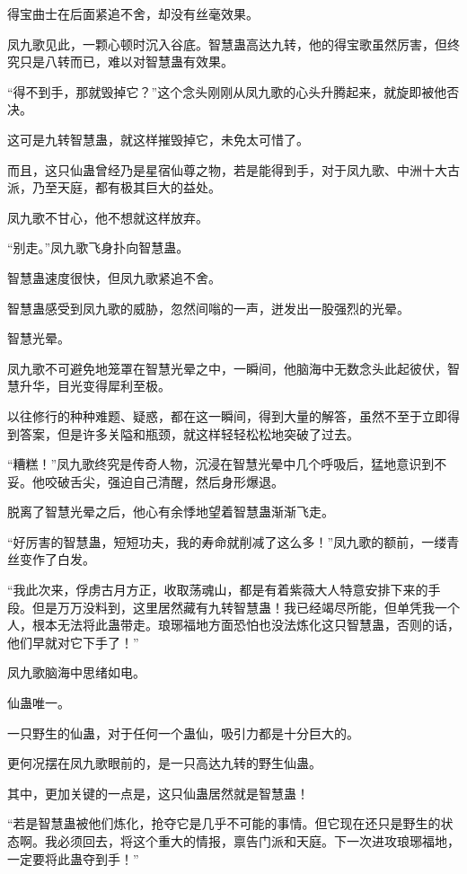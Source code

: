 \begin{this_body}
得宝曲士在后面紧追不舍，却没有丝毫效果。

凤九歌见此，一颗心顿时沉入谷底。智慧蛊高达九转，他的得宝歌虽然厉害，但终究只是八转而已，难以对智慧蛊有效果。

“得不到手，那就毁掉它？”这个念头刚刚从凤九歌的心头升腾起来，就旋即被他否决。

这可是九转智慧蛊，就这样摧毁掉它，未免太可惜了。

而且，这只仙蛊曾经乃是星宿仙尊之物，若是能得到手，对于凤九歌、中洲十大古派，乃至天庭，都有极其巨大的益处。

凤九歌不甘心，他不想就这样放弃。

“别走。”凤九歌飞身扑向智慧蛊。

智慧蛊速度很快，但凤九歌紧追不舍。

智慧蛊感受到凤九歌的威胁，忽然间嗡的一声，迸发出一股强烈的光晕。

智慧光晕。

凤九歌不可避免地笼罩在智慧光晕之中，一瞬间，他脑海中无数念头此起彼伏，智慧升华，目光变得犀利至极。

以往修行的种种难题、疑惑，都在这一瞬间，得到大量的解答，虽然不至于立即得到答案，但是许多关隘和瓶颈，就这样轻轻松松地突破了过去。

“糟糕！”凤九歌终究是传奇人物，沉浸在智慧光晕中几个呼吸后，猛地意识到不妥。他咬破舌尖，强迫自己清醒，然后身形爆退。

脱离了智慧光晕之后，他心有余悸地望着智慧蛊渐渐飞走。

“好厉害的智慧蛊，短短功夫，我的寿命就削减了这么多！”凤九歌的额前，一缕青丝变作了白发。

“我此次来，俘虏古月方正，收取荡魂山，都是有着紫薇大人特意安排下来的手段。但是万万没料到，这里居然藏有九转智慧蛊！我已经竭尽所能，但单凭我一个人，根本无法将此蛊带走。琅琊福地方面恐怕也没法炼化这只智慧蛊，否则的话，他们早就对它下手了！”

凤九歌脑海中思绪如电。

仙蛊唯一。

一只野生的仙蛊，对于任何一个蛊仙，吸引力都是十分巨大的。

更何况摆在凤九歌眼前的，是一只高达九转的野生仙蛊。

其中，更加关键的一点是，这只仙蛊居然就是智慧蛊！

“若是智慧蛊被他们炼化，抢夺它是几乎不可能的事情。但它现在还只是野生的状态啊。我必须回去，将这个重大的情报，禀告门派和天庭。下一次进攻琅琊福地，一定要将此蛊夺到手！”


\end{this_body}
